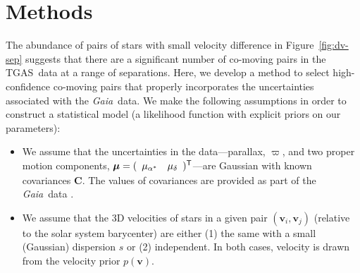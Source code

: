 \documentclass[manuscript, letterpaper]{aastex6}
\newcommand{\project}[1]{\textsl{#1}}
\newcommand{\acronym}[1]{{\small{#1}}}
\newcommand{\gaia}{\project{Gaia}}
\newcommand{\figname}{Figure}
\newcommand{\tgas}{\acronym{TGAS}}
\newcommand{\bs}[1]{\boldsymbol{#1}}
\newcommand{\propm}{\bs{\mu}}
\newcommand{\mat}[1]{\mathbf{#1}}
\renewcommand{\vec}[1]{\bs{#1}}
\begin{document}
\section{Methods} \label{sec:methods}

The abundance of pairs of stars with small velocity difference in
\figname~\ref{fig:dv-sep} suggests that there are a
significant number of co-moving pairs in the \tgas\ data at a range
of separations.
Here, we develop a method to select high-confidence co-moving
pairs that properly incorporates the uncertainties associated with the
\gaia\ data. We make the following assumptions in order to construct a
statistical model (a likelihood function with explicit priors on our
parameters):
\begin{itemize}
  \item We assume that the uncertainties in the data---parallax, $\varpi$, and
    two proper motion components, $\propm = (\begin{array}[t]{c c} \mu_{\alpha^*} &
    \mu_\delta\end{array})^\mathsf{T}$---are Gaussian with known covariances
    $\mat{C}$. The values of covariances are provided as part of the \gaia\ data
    \citep{Lindegren:2012aa,Lindegren:2016aa}.
  \item We assume that the 3D velocities of stars in a given pair
    $(\vec{v}_i, \vec{v}_j)$ (relative to the solar system
    barycenter) are either (1) the same with a small (Gaussian) dispersion $s$
    or (2) independent.
    In both cases, velocity is drawn from
    the velocity prior $p(\vec{v})$.
\end{itemize}
\end{document}
